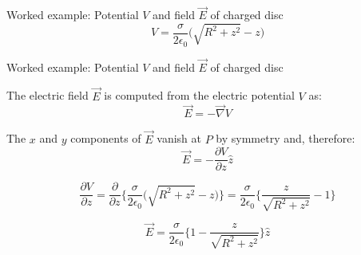 {\begin{frame}{Worked example: Potential $V$ and field $\vec{E}$ of charged disc}
  \begin{equation*}
    V =
     \frac{\sigma}{2\epsilon_0}
       \Big( \sqrt{R^2+z^2} - z \Big)
  \end{equation*}

\end{frame}

%
%
%

\begin{frame}{Worked example: Potential $V$ and field $\vec{E}$ of charged disc}

  The electric field $\vec{E}$ is computed from the electric potential $V$ as:
  \begin{equation*}
    \vec{E} = -\vec{\nabla} V
  \end{equation*}

  The $x$ and $y$ components of $\vec{E}$ vanish at $P$
  by symmetry and, therefore:
  \begin{equation*}
    \vec{E} = - \frac{\partial V}{\partial z} \hat{z}
  \end{equation*}

  \begin{equation*}
    \frac{\partial V}{\partial z} =
    \frac{\partial}{\partial z}
    \Big\{ \frac{\sigma}{2\epsilon_0} \Big( \sqrt{R^2+z^2} - z \Big) \Big\} =
    \frac{\sigma}{2\epsilon_0} \Big\{ \frac{z}{\sqrt{R^2+z^2}} - 1 \Big\}
  \end{equation*}

  \begin{equation*}
    \vec{E} = \frac{\sigma}{2\epsilon_0}
       \Big\{ 1 - \frac{z}{\sqrt{R^2+z^2}} \Big\} \hat{z}
  \end{equation*}

\end{frame}

} %


%
%
%

